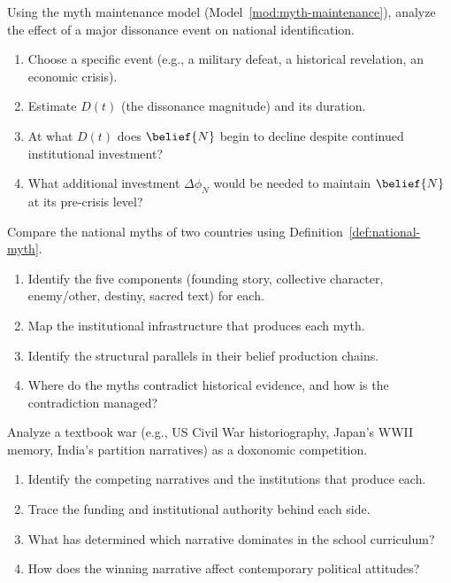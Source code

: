 \begin{exercise}
Using the myth maintenance model (Model~\ref{mod:myth-maintenance}), analyze the effect of a major dissonance event on national identification.
\begin{enumerate}[nosep]
  \item Choose a specific event (e.g., a military defeat, a historical revelation, an economic crisis).
  \item Estimate $D(t)$ (the dissonance magnitude) and its duration.
  \item At what $D(t)$ does $\belief{N}$ begin to decline despite continued institutional investment?
  \item What additional investment $\Delta \phi_N$ would be needed to maintain $\belief{N}$ at its pre-crisis level?
\end{enumerate}
\end{exercise}

\begin{exercise}
Compare the national myths of two countries using Definition~\ref{def:national-myth}.
\begin{enumerate}[nosep]
  \item Identify the five components (founding story, collective character, enemy/other, destiny, sacred text) for each.
  \item Map the institutional infrastructure that produces each myth.
  \item Identify the structural parallels in their belief production chains.
  \item Where do the myths contradict historical evidence, and how is the contradiction managed?
\end{enumerate}
\end{exercise}

\begin{exercise}
Analyze a textbook war (e.g., US Civil War historiography, Japan's WWII memory, India's partition narratives) as a doxonomic competition.
\begin{enumerate}[nosep]
  \item Identify the competing narratives and the institutions that produce each.
  \item Trace the funding and institutional authority behind each side.
  \item What has determined which narrative dominates in the school curriculum?
  \item How does the winning narrative affect contemporary political attitudes?
\end{enumerate}
\end{exercise}

